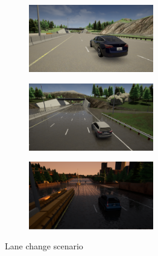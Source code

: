 \documentclass[conference, a4paper, 11pt]{IEEEtran}
\begin{document}
\begin{figure}[h]
    \centering
    \begin{subfigure}[c]{\textwidth}
        \centering
        \includegraphics[width=0.6\textwidth]{figures/generated/lanechange_original.PNG}
    \end{subfigure}
    \begin{subfigure}[c]{\textwidth}
        \centering
        \includegraphics[width=0.6\textwidth]{figures/generated/lanechange_1.PNG}
    \end{subfigure}
    \begin{subfigure}[c]{\textwidth}
        \centering
        \includegraphics[width=0.6\textwidth]{figures/generated/lanechange_2.PNG}
    \end{subfigure}
    \caption{Lane change scenario}
\end{figure}
\end{document}
